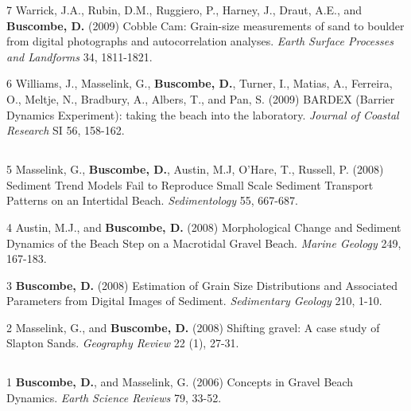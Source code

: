 \documentclass[margin,line]{resume}
\begin{document}
\begin{resume}
\begin{footnotesize}
\begin{list1}
	\item[7] Warrick, J.A., Rubin, D.M., Ruggiero, P., Harney, J., Draut, A.E., and {\bf Buscombe, D.} (2009) Cobble Cam: Grain-size measurements of sand to boulder from digital photographs and autocorrelation analyses. {\sl Earth Surface Processes and Landforms} 34, 1811-1821.\\

	\item[6] Williams, J., Masselink, G., {\bf Buscombe, D.}, Turner, I., Matias, A., Ferreira, O., Meltje, N., Bradbury, A., Albers, T., and Pan, S. (2009) BARDEX (Barrier Dynamics Experiment): taking the beach into the laboratory. {\sl Journal of Coastal Research} SI 56, 158-162.
	\end{list1}
	
	\subsection{}
	\begin{list1}
	\item[5] Masselink, G., {\bf Buscombe, D.}, Austin, M.J, O'Hare, T., Russell, P. (2008) Sediment Trend Models Fail to Reproduce Small Scale Sediment Transport Patterns on an Intertidal Beach. {\sl Sedimentology} 55, 667-687.\\
	
	\item[4] Austin, M.J., and {\bf Buscombe, D.} (2008) Morphological Change and Sediment Dynamics of the Beach Step on a Macrotidal Gravel Beach. {\sl Marine Geology} 249, 167-183. \\
	
	\item[3] {\bf Buscombe, D.} (2008) Estimation of Grain Size Distributions and Associated Parameters from Digital Images of Sediment. {\sl Sedimentary Geology}  210, 1-10.\\

	\item[2] Masselink, G., and {\bf Buscombe, D.} (2008) Shifting gravel: A case study of Slapton Sands. {\sl Geography Review} 22 (1), 27-31.
	\end{list1}

	\subsection{}
	\begin{list1}
	\item[1] {\bf Buscombe, D.}, and Masselink, G. (2006) Concepts in Gravel Beach Dynamics. {\sl Earth Science Reviews} 79, 33-52.
	\end{list1}


\end{footnotesize}
\end{resume}
\end{document}
